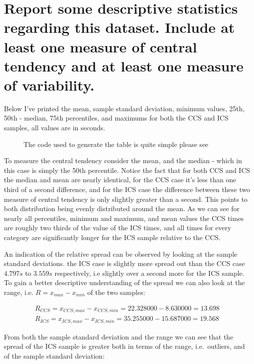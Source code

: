 \documentclass{article}
\begin{document}
\section{Report some descriptive statistics regarding this dataset.  Include at
least one measure of central tendency and at least one measure of variability.}
\label{sec:question3}
  Below I've printed the mean, sample standard deviation, minimum values,
25th, 50th - median, 75th percentiles, and maximums for both the CCS
and ICS samples, all values are in seconds. 
\begin{figure}[ht]
  \centering
  
  \caption{The code used to generate the table is quite simple please see
  \url{}}
  \label{fig:descriptive_data_describe}
\end{figure}
\begin{center}
\end{center}
To measure the central tendency consider the mean, and the median - which in this
case is simply the 50th percentile. Notice the fact that for both CCS and ICS
the median and mean are nearly identical, for the CCS case it's less than one
third of a second difference, and for the ICS case the difference between these
two measure of central tendency is only slightly greater than a second. This
points to both distribution being evenly distributed around the mean. As we can
see for nearly all percentiles, minimum and maximum, and mean values the CCS
times are roughly two thirds of the value of the ICS times, and all times for
every category are significantly longer for the ICS sample relative to the CCS.

An indication of the relative spread can be observed by looking at the sample
standard deviations. the ICS case is slightly more spread out than the CCS case
\(4.797s\) to \(3.559s\) respectively, i.e slightly over a second more for the
ICS sample. To gain a better descriptive understanding of the spread we can also
look at the range, i.e.  \(R = x_{max} - x_{min}\) of the two samples:

\begin{align*}
R_{CCS} = x_{CCS,max} - x_{CCS,min} = 22.328000 - 8.630000 = 13.698\\
R_{ICS} = x_{ICS,max} - x_{ICS,min} = 35.255000 - 15.687000 = 19.568
\end{align*}

From both the sample standard deviation and the range we can see that the spread
of the ICS sample is greater both in terms of the range, i.e.~outliers, and of
the sample standard deviation:
\end{document}
